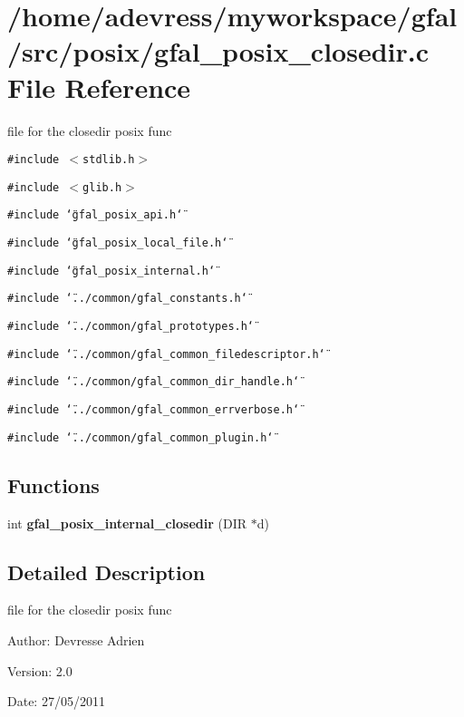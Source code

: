 \section{/home/adevress/myworkspace/gfal/src/posix/gfal\_\-posix\_\-closedir.c File Reference}
\label{gfal__posix__closedir_8c}
file for the closedir posix func 

{\tt \#include $<$stdlib.h$>$}\par
{\tt \#include $<$glib.h$>$}\par
{\tt \#include \char`\"{}gfal\_\-posix\_\-api.h\char`\"{}}\par
{\tt \#include \char`\"{}gfal\_\-posix\_\-local\_\-file.h\char`\"{}}\par
{\tt \#include \char`\"{}gfal\_\-posix\_\-internal.h\char`\"{}}\par
{\tt \#include \char`\"{}../common/gfal\_\-constants.h\char`\"{}}\par
{\tt \#include \char`\"{}../common/gfal\_\-prototypes.h\char`\"{}}\par
{\tt \#include \char`\"{}../common/gfal\_\-common\_\-filedescriptor.h\char`\"{}}\par
{\tt \#include \char`\"{}../common/gfal\_\-common\_\-dir\_\-handle.h\char`\"{}}\par
{\tt \#include \char`\"{}../common/gfal\_\-common\_\-errverbose.h\char`\"{}}\par
{\tt \#include \char`\"{}../common/gfal\_\-common\_\-plugin.h\char`\"{}}\par
\subsection*{Functions}
\begin{CompactItemize}
\item 
int \textbf{gfal\_\-posix\_\-internal\_\-closedir} (DIR $\ast$d)\label{gfal__posix__closedir_8c_3137761fa72f5cd168e84d82800a08be}

\end{CompactItemize}


\subsection{Detailed Description}
file for the closedir posix func 

\begin{Desc}
\item[Author:]Devresse Adrien \end{Desc}
\begin{Desc}
\item[Version:]2.0 \end{Desc}
\begin{Desc}
\item[Date:]27/05/2011 \end{Desc}
